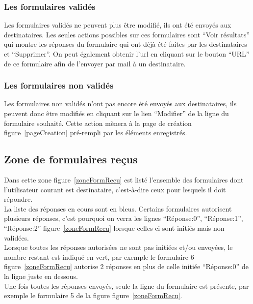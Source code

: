 \documentclass[a4paper,11pt,final]{report}
\begin{document}
\subsubsection{Les formulaires validés}
Les formulaires validés ne peuvent plus être modifié, ils ont été envoyés aux destinataires. Les seules actions possibles sur ces formulaires sont ``Voir résultats'' qui montre les réponses du formulaire qui ont déjà été faites par les destinataires et ``Supprimer''. On peut également obtenir l'url en cliquant sur le bouton ``URL'' de ce formulaire afin de l'envoyer par mail à un destinataire.

\noindent\begin{minipage}{\linewidth}%
\label{urlForm}
\end{minipage}

\subsubsection{Les formulaires non validés}
Les formulaires non validés n'ont pas encore été envoyés aux destinataires, ils peuvent donc être modifiés en cliquant sur le lien ``Modifier'' de la ligne du formulaire souhaité. Cette action mènera à la page de création figure~\ref{pageCreation} pré-rempli par les éléments enregistrés.

\subsection{Zone de formulaires reçus}
Dans cette zone figure~\ref{zoneFormRecu} est listé l'ensemble des formulaires dont l'utilisateur courant est destinataire, c'est-à-dire ceux pour lesquels il doit répondre.\\
La liste des réponses en cours sont en bleus. Certains formulaires autorisent plusieurs réponses, c'est pourquoi on verra les lignes ``Réponse\string:0'', ``Réponse\string:1'', ``Réponse\string:2'' figure~\ref{zoneFormRecu} lorsque celles-ci sont initiés mais non validées.\\
Lorsque toutes les réponses autorisées ne sont pas initiées et/ou envoyées, le nombre restant est indiqué en vert, par exemple le formulaire 6 figure~\ref{zoneFormRecu} autorise 2 réponses en plus de celle initiée ``Réponse\string:0'' de la ligne juste en dessous.\\
Une fois toutes les réponses envoyés, seule la ligne du formulaire est présente, par exemple le formulaire 5 de la figure figure~\ref{zoneFormRecu}.\\
\end{document}
